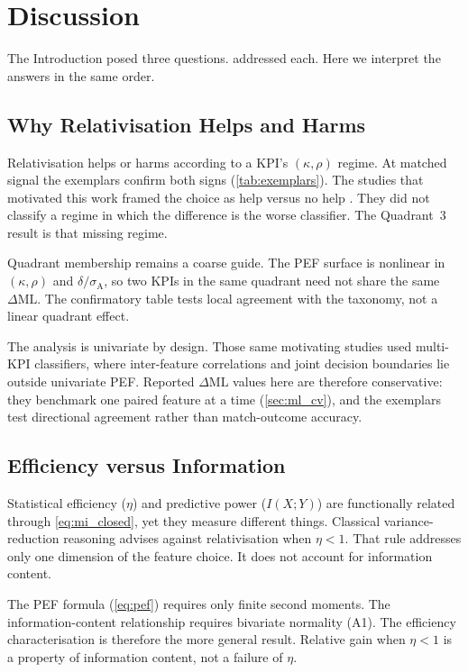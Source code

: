 \section{Discussion}
\label{sec:discussion}

The Introduction posed three questions.  addressed each. Here we interpret the answers in the same order.

\subsection{Why Relativisation Helps and Harms}

Relativisation helps or harms according to a KPI's $(\kappa,\rho)$ regime. At matched signal the exemplars confirm both signs (\cref{tab:exemplars}). The studies that motivated this work framed the choice as help versus no help \parencite{bennett2019descriptive,bennett2021predicting,mosey2020,scott2023urc,scott2023womens}. They did not classify a regime in which the difference is the worse classifier. The Quadrant~3 result is that missing regime.

Quadrant membership remains a coarse guide. The PEF surface is nonlinear in $(\kappa,\rho)$ and $\delta/\sigma_{\mathrm{A}}$, so two KPIs in the same quadrant need not share the same $\Delta\mathrm{ML}$. The confirmatory table tests local agreement with the taxonomy, not a linear quadrant effect.

The analysis is univariate by design. Those same motivating studies used multi-KPI classifiers, where inter-feature correlations and joint decision boundaries lie outside univariate PEF. Reported $\Delta\mathrm{ML}$ values here are therefore conservative: they benchmark one paired feature at a time (\cref{sec:ml_cv}), and the exemplars test directional agreement rather than match-outcome accuracy.

\subsection{Efficiency versus Information}

Statistical efficiency ($\eta$) and predictive power ($I(X;Y)$) are functionally related through \cref{eq:mi_closed}, yet they measure different things. Classical variance-reduction reasoning advises against relativisation when $\eta<1$. That rule addresses only one dimension of the feature choice. It does not account for information content.

The PEF formula (\cref{eq:pef}) requires only finite second moments. The information-content relationship requires bivariate normality (A1). The efficiency characterisation is therefore the more general result. Relative gain when $\eta<1$ is a property of information content, not a failure of $\eta$.

